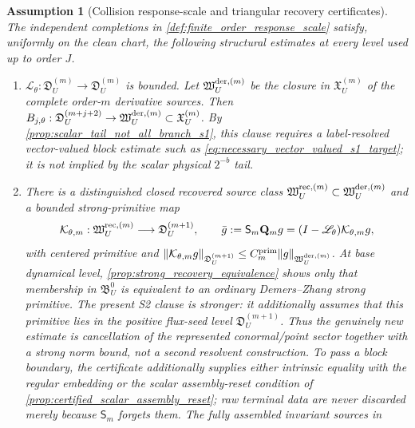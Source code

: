 \documentclass[11pt]{amsart}
\theoremstyle{compactplain}
\theoremstyle{compactdefinition}
\newtheorem{assumption}[theorem]{Assumption}
\theoremstyle{compactremark}
\newcommand{\Ltransfer}{\mathscr L}
\begin{document}
\begin{assumption}[Collision response-scale and triangular recovery certificates]
\label{ass:response_scale_dynamics}
The independent completions in \cref{def:finite_order_response_scale} satisfy,
uniformly on the clean chart, the following structural estimates at every
level used up to order \(J\).
\begin{enumerate}[label=\textup{(S\arabic*)},wide,labelindent=0pt]
  \item \(\Ltransfer_\theta:\mathfrak D_U^{(m)}\to
  \mathfrak D_U^{(m)}\) is bounded.  Let
  \(\mathfrak W_U^{{\rm der},(m)}\) be the closure in
  \(\mathfrak X_U^{(m)}\) of the complete order-\(m\) derivative sources.  Then
  \(B_{j,\theta}:\mathfrak D_U^{(m+j+2)}\to
  \mathfrak W_U^{{\rm der},(m)}\subset\mathfrak X_U^{(m)}\).
  By \cref{prop:scalar_tail_not_all_branch_s1}, this clause requires a
  label-resolved vector-valued block estimate such as
  \eqref{eq:necessary_vector_valued_s1_target}; it is not implied by the
  scalar physical \(2^{-b}\) tail.
  \item There is a distinguished closed recovered source class
  \(\mathfrak W_U^{{\rm rec},(m)}\subset
    \mathfrak W_U^{{\rm der},(m)}\) and a bounded strong-primitive map
  \begin{equation}
  \label{eq:strong_primitive_recovery}
    \mathcal K_{\theta,m}:\mathfrak W_U^{{\rm rec},(m)}
       \longrightarrow \mathfrak D_U^{(m+1)},\qquad
    \bar g:=\mathsf S_m\mathbf Q_mg
      =(I-\Ltransfer_\theta)\mathcal K_{\theta,m}g,
  \end{equation}
  with centered primitive and
  \(\|\mathcal K_{\theta,m}g\|_{\mathfrak D_U^{(m+1)}}
    \le C_m^{\rm prim}\|g\|_{\mathfrak W_U^{{\rm der},(m)}}\).
  At base dynamical level, \cref{prop:strong_recovery_equivalence} shows only
  that membership in \(\mathfrak B_U^0\) is equivalent to an ordinary
  Demers--Zhang strong primitive.  The present S2 clause is stronger: it
  additionally assumes that this primitive lies in the positive flux-seed
  level \(\mathfrak D_U^{(m+1)}\).  Thus the genuinely new estimate is
  cancellation of the
  represented conormal/point sector together with a strong norm bound, not a
  second resolvent construction.  To pass a block boundary, the certificate
  additionally supplies either intrinsic equality with the regular embedding
  or the scalar assembly-reset condition of
  \cref{prop:certified_scalar_assembly_reset}; raw terminal data are never
  discarded merely because \(\mathsf S_m\) forgets them.
  The fully assembled invariant sources in

\end{enumerate}
\end{assumption}
\end{document}
